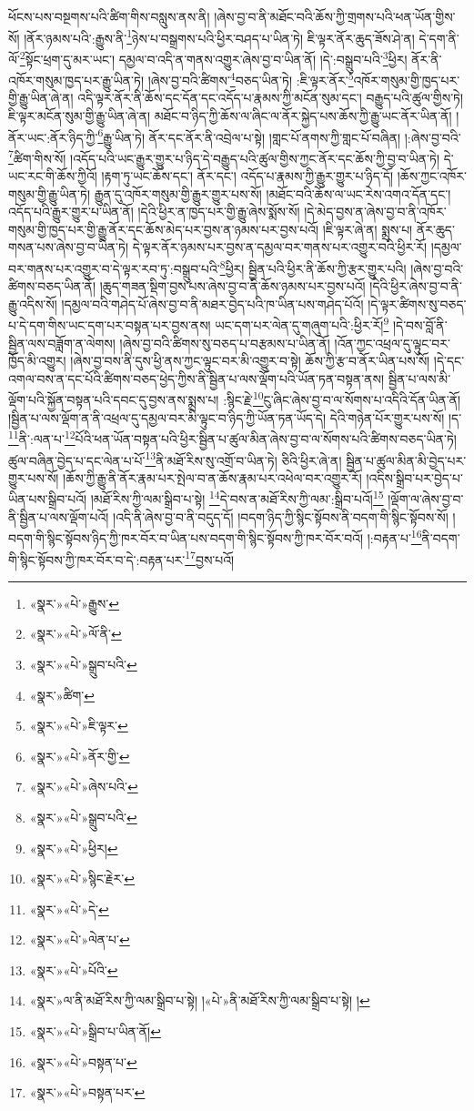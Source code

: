 ཕོངས་པས་བསྔགས་པའི་ཚིག་གིས་བསླུས་ནས་ནི། །ཞེས་བྱ་བ་ནི་མཐོང་བའི་ཆོས་ཀྱི་གྲགས་པའི་ཕན་ཡོན་གྱིས་སོ། །ནོར་ཉམས་པའི་:རྒྱུས་ནི་\footnote{«སྣར་»«པེ་»རྒྱུས་}ཉེས་པ་བསྒྲགས་པའི་ཕྱིར་བཤད་པ་ཡིན་ཏེ། ཇི་ལྟར་ནོར་ཆུད་ཟོས་ཤེ་ན། དེ་དག་ནི་ལོ་\footnote{«སྣར་»«པེ་»ལོ་ནི་}སྟོང་ཕྲག་དུ་མར་ཡང་། དམྱལ་བ་འདི་ན་གནས་འགྱུར་ཞེས་བྱ་བ་ཡིན་ནོ། །དེ་:བསྒྲུབ་པའི་\footnote{«སྣར་»«པེ་»སྒྲུབ་པའི་}ཕྱིར། ནོར་ནི་འཁོར་གསུམ་ཁྱད་པར་རྒྱུ་ཡིན་ཏེ། །ཞེས་བྱ་བའི་ཚིགས་\footnote{«སྣར་»ཚིག་}བཅད་ཡིན་ཏེ། :ཇི་ལྟར་ནོར་\footnote{«སྣར་»«པེ་»ཇི་ལྟར་}འཁོར་གསུམ་གྱི་ཁྱད་པར་གྱི་རྒྱུ་ཡིན་ཞེ་ན། འདི་ལྟར་ནོར་ནི་ཆོས་དང་དོན་དང་འདོད་པ་རྣམས་ཀྱི་མངོན་སུམ་དང་། བརྒྱུད་པའི་ཚུལ་གྱིས་ཏེ། ཇི་ལྟར་མངོན་སུམ་གྱི་རྒྱུ་ཡིན་ཞེ་ན། མཐོང་བ་ཉིད་ཀྱི་ཆོས་ལ་ཞིང་ལ་ནོར་སྐྱེད་པས་ཆོས་ཀྱི་རྒྱུ་ཡང་ནོར་ཡིན་ནོ། །ནོར་ཡང་:ནོར་ཉིད་ཀྱི་\footnote{«སྣར་»«པེ་»ནོར་གྱི་}རྒྱུ་ཡིན་ཏེ། ནོར་དང་ནོར་ནི་འབྲེལ་པ་སྟེ། །གླང་པོ་ནགས་ཀྱི་གླང་པོ་བཞིན། །:ཞེས་བྱ་བའི་\footnote{«སྣར་»«པེ་»ཞེས་པའི་}ཚིག་གིས་སོ། །འདོད་པའི་ཡང་རྒྱུར་གྱུར་པ་ཉིད་དེ་བརྒྱུད་པའི་ཚུལ་གྱིས་ཀྱང་ནོར་དང་ཆོས་ཀྱི་བྱ་བ་ཡིན་ཏེ། དེ་ཡང་རང་གི་ཆོས་ཀྱིའོ། །རྟག་ཏུ་ཡང་ཆོས་དང་། ནོར་དང་། འདོད་པ་རྣམས་ཀྱི་རྒྱུར་གྱུར་པ་ཉིད་དོ། །ཆོས་ཀྱང་འཁོར་གསུམ་གྱི་རྒྱུ་ཡིན་ཏེ། རྒྱུན་དུ་འཁོར་གསུམ་གྱི་རྒྱུར་གྱུར་པས་སོ། །མཐོང་བའི་ཆོས་ལ་ཡང་རེས་འགའ་དོན་དང་། འདོད་པའི་རྒྱུར་གྱུར་པ་ཡིན་ནོ། །དེའི་ཕྱིར་ན་ཁྱད་པར་གྱི་རྒྱུ་ཞེས་སྨོས་སོ། །དེ་མེད་བྱས་ན་ཞེས་བྱ་བ་ནི་འཁོར་གསུམ་གྱི་ཁྱད་པར་གྱི་རྒྱུ་ནོར་དང་ཆོས་མེད་པར་བྱས་ན་ཉམས་པར་བྱས་པའོ། །ཇི་ལྟར་ཞེ་ན། སྨྲས་པ། ནོར་ཆུད་གསན་པས་ཞེས་བྱ་བ་ཡིན་ཏེ། དེ་ལྟར་ནོར་ཉམས་པར་བྱས་ན་དམྱལ་བར་གནས་པར་འགྱུར་བའི་ཕྱིར་རོ། །དམྱལ་བར་གནས་པར་འགྱུར་བ་དེ་ལྟར་རབ་ཏུ་:བསྒྲུབ་པའི་\footnote{«སྣར་»«པེ་»སྒྲུབ་པའི་}ཕྱིར། སྦྱིན་པའི་ཕྱིར་ནི་ཆོས་ཀྱི་རྩར་གྱུར་པའི། །ཞེས་བྱ་བའི་ཚིགས་བཅད་ཡིན་ནོ། །ཆུད་གཟན་སྡིག་བྱས་པས་ཞེས་བྱ་བ་ནི་ཆོས་ཉམས་པར་བྱས་པའོ། །དེའི་ཕྱིར་ཞེས་བྱ་བ་ནི་རྒྱུ་འདིས་སོ། །དམྱལ་བའི་གཤེད་པོ་ཞེས་བྱ་བ་ནི་མཐར་བྱེད་པའི་ཁ་ཡིན་པས་གཤེད་པོའོ། །དེ་ལྟར་ཚིགས་སུ་བཅད་པ་དེ་དག་གིས་ཡང་དག་པར་བསྟན་པར་བྱས་ནས། ཡང་དག་པར་ལེན་དུ་གཞུག་པའི་:ཕྱིར་རོ།\footnote{«སྣར་»«པེ་»ཕྱིར།} །དེ་བས་བློ་ནི་སྦྱིན་ལས་བཟློག་ན་ལེགས། །ཞེས་བྱ་བའི་ཚིགས་སུ་བཅད་པ་བརྩམས་པ་ཡིན་ནོ། །འོན་ཀྱང་འཕྲལ་དུ་ལྟུང་བར་ཁྱོད་མི་འགྱུར། །ཞེས་བྱ་བས་ནི་དུས་ཕྱི་ནས་ཀྱང་ལྟུང་བར་མི་འགྱུར་བ་སྟེ། ཆོས་ཀྱི་རྩ་བ་ནོར་ཡིན་པས་སོ། །དེ་དང་འགལ་བས་ན་དང་པོའི་ཚིགས་བཅད་ཕྱེད་ཀྱིས་ནི་སྦྱིན་པ་ལས་ལྡོག་པའི་ཡོན་ཏན་བསྟན་ནས། སྦྱིན་པ་ལས་མི་ལྡོག་པའི་སྐྱོན་བསྟན་པའི་དབང་དུ་བྱས་ནས་སྨྲས་པ། :སྙིང་རྗེ་\footnote{«སྣར་»«པེ་»སྙིང་རྗེར་}ངུ་ཞིང་ཞེས་བྱ་བ་ལ་སོགས་པ་འདིའི་དོན་ཡིན་ནོ། །སྦྱིན་པ་ལས་ལྡོག་ན་ནི་འཕྲལ་དུ་དམྱལ་བར་མི་ལྟུང་བ་ཉིད་ཀྱི་ཡོན་ཏན་ཡོད་དེ། དེའི་གཉེན་པོར་གྱུར་པས་སོ། །ད་\footnote{«སྣར་»«པེ་»དེ་}ནི་:ལན་པ་\footnote{«སྣར་»«པེ་»ལེན་པ་}པོའི་ཕན་ཡོན་བསྟན་པའི་ཕྱིར་སྦྱིན་པ་ཚུལ་མིན་ཞེས་བྱ་བ་ལ་སོགས་པའི་ཚིགས་བཅད་ཡིན་ཏེ། ཚུལ་བཞིན་བྱེད་པ་དང་ལེན་པ་པོ་\footnote{«སྣར་»«པེ་»པོའི་}ནི་མཐོ་རིས་སུ་འགྲོ་བ་ཡིན་ཏེ། ཅིའི་ཕྱིར་ཞེ་ན། སྦྱིན་པ་ཚུལ་མིན་མི་བྱེད་པར་གྱུར་པས་སོ། །ཆོས་ཀྱི་རྒྱུ་ནི་ནོར་རྣམ་པར་སྤེལ་བ་ན་ཆོས་རྣམ་པར་འཕེལ་བར་འགྱུར་རོ། །འདིས་སྒྲིབ་པར་བྱེད་པ་ཡིན་པས་སྒྲིབ་པའོ། །མཐོ་རིས་ཀྱི་ལམ་སྒྲིབ་པ་སྟེ། \footnote{«སྣར་»ལ་ནི་མཐོ་རིས་ཀྱི་ལམ་སྒྲིབ་པ་སྟེ། །«པེ་»ནི་མཐོ་རིས་ཀྱི་ལམ་སྒྲིབ་པ་སྟེ། །}དེ་བས་ན་མཐོ་རིས་ཀྱི་ལམ་:སྒྲིབ་པའོ།\footnote{«སྣར་»«པེ་»སྒྲིབ་པ་ཡིན་ནོ།} །ལྡོག་ལ་ཞེས་བྱ་བ་ནི་སྦྱིན་པ་ལས་ལྡོག་པའོ། །འདི་ནི་ཞེས་བྱ་བ་ནི་བདུད་དོ། །བདག་ཉིད་ཀྱི་སྙིང་སྟོབས་ནི་བདག་གི་སྙིང་སྟོབས་སོ། །བདག་གི་སྙིང་སྟོབས་ཉིད་ཀྱི་ཁར་བོར་བ་ཡིན་པས་བདག་གི་སྙིང་སྟོབས་ཀྱི་ཁར་བོར་བའོ། །:བརྟན་པ་\footnote{«སྣར་»«པེ་»བསྟན་པ་}ནི་བདག་གི་སྙིང་སྟོབས་ཀྱི་ཁར་བོར་བ་དེ་:བརྟན་པར་\footnote{«སྣར་»«པེ་»བསྟན་པར་}བྱས་པའོ། 
